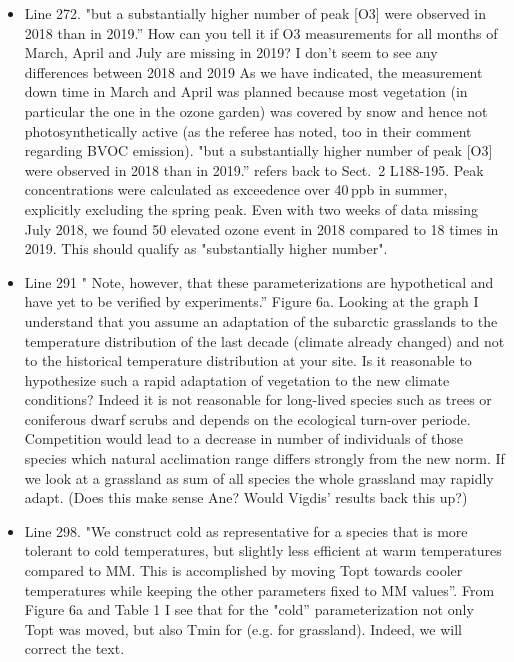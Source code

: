 \documentclass{scrartcl}
\begin{document}
\begin{itemize}
\item {\color{blue}Line 272. "but a substantially higher number of peak [O3] were observed in 2018 than in 2019.” How can you tell it if O3 measurements for all months of March, April and July are missing in 2019? I don't seem to see any differences between 2018 and 2019}
As we have indicated, the measurement down time in March and April was planned because most vegetation (in particular the one in the ozone garden) was covered by snow and hence not photosynthetically active (as the referee has noted, too in their comment regarding BVOC emission). "but a substantially higher number of peak [O3] were observed in 2018 than in 2019.” refers back to Sect.~2 L188-195. Peak concentrations were calculated as exceedence over 40\,ppb in summer, explicitly excluding the spring peak. Even with two weeks of data missing July 2018, we found 50 elevated ozone event in 2018 compared to 18 times in 2019. This should qualify as "substantially higher number".

\item {\color{blue}Line 291 " Note, however, that these parameterizations are hypothetical and have yet to be verified by experiments.” Figure 6a.  Looking at the graph I understand that you assume an adaptation of the subarctic grasslands to the temperature distribution of the last decade (climate already changed) and not to the historical temperature distribution at your site. Is it reasonable to hypothesize such a rapid adaptation of vegetation to the new climate conditions?} Indeed it is not reasonable for long-lived species such as trees or coniferous dwarf scrubs and depends on the ecological turn-over periode. Competition would lead to a decrease in number of individuals of those species which natural acclimation range differs strongly from the new norm. If we look at a grassland as sum of all species the whole grassland may rapidly adapt. (Does this make sense Ane? Would Vigdis' results back this up?) 

\item {\color{blue}Line 298. "We construct cold as representative for a species that is more tolerant to cold temperatures, but slightly less efficient at warm temperatures compared to MM. This is accomplished by moving Topt towards cooler temperatures while keeping the other parameters fixed to MM values”.
From Figure 6a and Table 1 I see that for the "cold” parameterization not only Topt was moved, but also Tmin for (e.g. for grassland).}
Indeed, we will correct the text.


\end{itemize}
\end{document}
